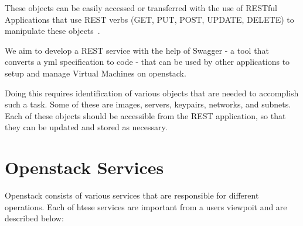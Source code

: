 These objects can be easily accessed or transferred with the use of
RESTful Applications that use REST verbs (GET, PUT, POST, UPDATE,
DELETE) to manipulate these objects~\cite{hid-sp18-503-REST}.

We aim to develop a REST service with the help of Swagger - a tool
that converts a yml specification to code - that can be used by other
applications to setup and manage Virtual Machines on openstack.

Doing this requires identification of various objects that are needed
to accomplish such a task. Some of these are images, servers,
keypairs, networks, and subnets. Each of these objects should be
accessible from the REST application, so that they can be updated and
stored as necessary.

\section{Openstack Services}
Openstack consists of various services that are responsible for
different operations. Each of htese services are important from a
users viewpoit and are described below:


